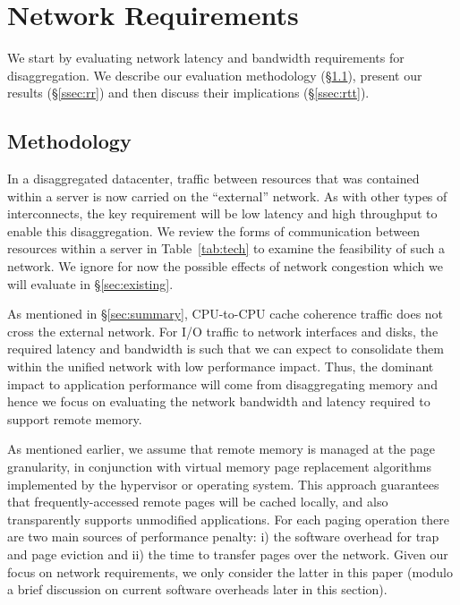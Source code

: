 \section{\dis Network Requirements}
\label{sec:requirements}





We start by evaluating network latency and bandwidth requirements for disaggregation.
We describe our evaluation methodology (\S \ref{ssec:rmethod}), present our results (\S \ref{ssec:rr}) and then discuss their implications (\S \ref{ssec:rtt}). 

\subsection{Methodology}
\label{ssec:rmethod}
In a disaggregated datacenter, traffic between resources that was contained within a server is now carried on the “external” network. As with other types of interconnects, the key requirement will be low latency and high throughput to enable this disaggregation. We review the forms of communication between resources within a server in Table~\ref{tab:tech} to examine the feasibility of such a network. 
We ignore for now the possible effects of network congestion which we will evaluate in \S\ref{sec:existing}.

As mentioned in \S\ref{sec:summary}, CPU-to-CPU cache coherence traffic does not cross the external network.
For I/O traffic to network interfaces and disks, the required latency and bandwidth is such that we can expect to consolidate them within the unified network with low performance impact. 
Thus, the dominant impact to application performance will come from disaggregating memory and hence we focus on evaluating the network bandwidth and latency required to support remote memory.

As mentioned earlier, we assume that remote memory is managed at the page granularity, in conjunction with virtual memory page replacement algorithms implemented by the hypervisor or operating system. This approach guarantees that frequently-accessed remote pages will be cached locally, and also transparently supports unmodified applications.
For each paging operation there are two main sources 
of performance penalty: i) the software overhead for trap and page eviction and ii) the time to transfer pages over the network. 
Given our focus on network requirements, we only consider the latter in this paper (modulo a brief discussion on current 
software overheads later in this section).

